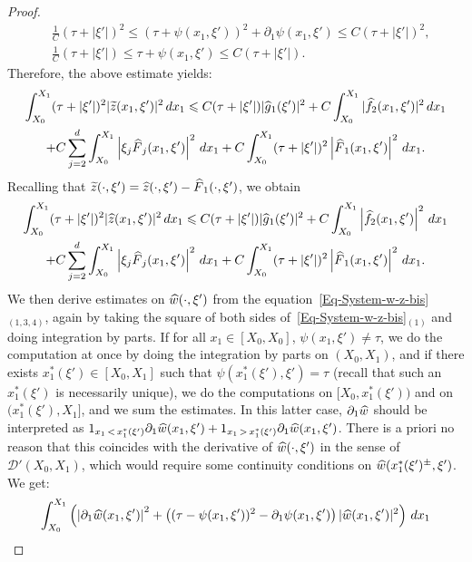 \documentclass[10pt]{amsart}
\theoremstyle{definition}\newtheorem{defi}[theo]{Definition}\newtheorem{rema}[theo]{Remark}\newtheorem{exam}[theo]{Example}\newtheorem{exem}[theo]{Example}\newtheorem{nota}[theo]{Notation}
\newcommand{\scD}{\mathscr{D}}
\renewcommand{\leq}{\leqslant}
\renewcommand{\tilde}{\widetilde}
\renewcommand{\hat}{\widehat}
\let\oldtilde\tilde
\renewcommand*{\tilde}[1]{\mathchoice{\widetilde{#1}}{\widetilde{#1}}{\oldtilde{#1}}{\oldtilde{#1}}}
\let\oldhat\hat
\renewcommand*{\hat}[1]{\mathchoice{\widehat{#1}}{\widehat{#1}}{\oldhat{#1}}{\oldhat{#1}}}
\begin{document}
\begin{proof}
\begin{align*}
&
\frac{1}{C} (\tau + |\xi'|)^2
\leq (\tau + \psi(x_1, \xi'))^2 + \partial_1 \psi(x_1, \xi') \leq {C} (\tau + |\xi'|)^2,
\\
& \frac{1}{C} (\tau + |\xi'|) \leq \tau + \psi(x_1, \xi') \leq C (\tau + |\xi'|).
\end{align*}
Therefore, the above estimate yields:
\begin{multline*}
\int_{X_0}^{X_1} (\tau + |\xi'|)^2 |\tilde z(x_1, \xi')|^2 \, dx_1
\leq C (\tau + |\xi'|) |\hat g_1(\xi')|^2 + C \int_{X_0}^{X_1} | \widehat f_2(x_1, \xi') |^2 \, dx_1
\\
+ C \sum_{j=2}^d \int_{X_0}^{X_1} \left|\xi_j \hat F_j(x_1, \xi')\right|^2 \, dx_1 + C \int_{X_0}^{X_1} (\tau + |\xi'|)^2 \left|\hat F_1(x_1, \xi') \right|^2 \, dx_1.
\end{multline*}
Recalling that $\tilde z(\cdot, \xi') = \hat z(\cdot, \xi') -\hat F_1(\cdot, \xi')$, we obtain
\begin{multline*}
\int_{X_0}^{X_1} (\tau + |\xi'|)^2 |\hat z(x_1, \xi')|^2 \, dx_1
\leq C (\tau + |\xi'|) |\hat g_1(\xi')|^2 + C \int_{X_0}^{X_1} \left| \widehat f_2(x_1, \xi') \right|^2 \, dx_1
\\
+ C \sum_{j=2}^d \int_{X_0}^{X_1} \left|\xi_j \hat F_j(x_1, \xi')\right|^2 \, dx_1 + C \int_{X_0}^{X_1} (\tau + |\xi'|)^2 \left|\hat F_1(x_1, \xi') \right|^2 \, dx_1.
\end{multline*}
We then derive estimates on $\hat w(\cdot, \xi') $ from the equation~\eqref{Eq-System-w-z-bis}$_{(1,3,4)}$, again by taking the square of both sides of~\eqref{Eq-System-w-z-bis}$_{(1)}$ and doing integration by parts. If for all $x_1 \in [X_0, X_0]$, $\psi(x_1, \xi') \neq \tau$, we do the computation at once by doing the integration by parts on $(X_0, X_1)$, and if there exists $x_1^*(\xi') \in [X_0, X_1]$ such that $\psi(x_1^*(\xi'), \xi') = \tau$ (recall that such an $x_1^*(\xi')$ is necessarily unique), we do the computations on $[X_0, x_1^*(\xi'))$ and on $(x_1^*(\xi'), X_1]$, and we sum the estimates. In this latter case, $\partial_1 \hat w$ should be interpreted as $1_{x_1\,<\,x_1^*(\xi')} \partial_1 \hat w(x_1, \xi') + 1_{x_1\,>\,x_1^*(\xi')} \partial_1 \hat w(x_1, \xi')$. There is a priori no reason that this coincides with the derivative of $\hat w(\cdot, \xi')$ in the sense of $\scD'(X_0,X_1)$, which would require some continuity conditions on $\hat w(x_1^*(\xi')^\pm, \xi')$. We get:
\begin{multline*}
\int_{X_0}^{X_1}\left(\left|\partial_1 \hat w(x_1, \xi')\right|^2 + \left((\tau - \psi(x_1, \xi'))^2 - \partial_1 \psi(x_1, \xi') \right) |\hat w(x_1, \xi')|^2\right) \, dx_1

\end{multline*}
\end{proof}
\end{document}
